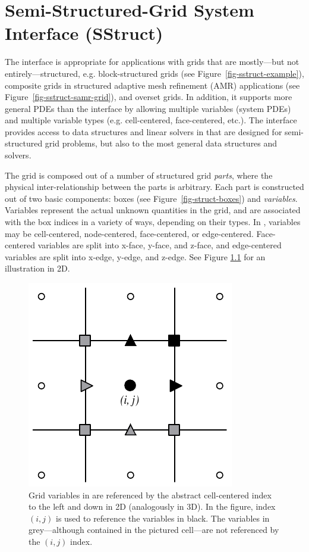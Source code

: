 
\chapter{Semi-Structured-Grid System Interface (SStruct)}
\label{ch-SStruct}

The  interface is appropriate for applications with grids that
are mostly---but not entirely---structured, e.g. block-structured grids (see
Figure~\ref{fig-sstruct-example}), composite grids in structured adaptive mesh
refinement (AMR) applications (see Figure~\ref{fig-sstruct-samr-grid}), and
overset grids.  In addition, it supports more general PDEs than the
 interface by allowing multiple variables (system PDEs) and
multiple variable types (e.g. cell-centered, face-centered, etc.).  The
interface provides access to data structures and linear solvers in \hypre{}
that are designed for semi-structured grid problems, but also to the most
general data structures and solvers.

The  grid is composed out of a number of structured grid {\em
parts}, where the physical inter-relationship between the parts is arbitrary.
Each part is constructed out of two basic components: boxes (see
Figure~\ref{fig-struct-boxes}) and {\em variables}.  Variables represent the
actual unknown quantities in the grid, and are associated with the box indices
in a variety of ways, depending on their types.  In \hypre{}, variables may be
cell-centered, node-centered, face-centered, or edge-centered.  Face-centered
variables are split into x-face, y-face, and z-face, and edge-centered
variables are split into x-edge, y-edge, and z-edge.  See Figure
\ref{fig-gridvars} for an illustration in 2D.

\begin{figure}
\centering
\includegraphics[width=.3\textwidth]{figSStructGridVars}
\caption{%
Grid variables in \hypre{} are referenced by the abstract cell-centered index
to the left and down in 2D (analogously in 3D).  In the figure, index $(i,j)$
is used to reference the variables in black.  The variables in grey---although
contained in the pictured cell---are not referenced by the $(i,j)$ index.}
\label{fig-gridvars}
\end{figure}

